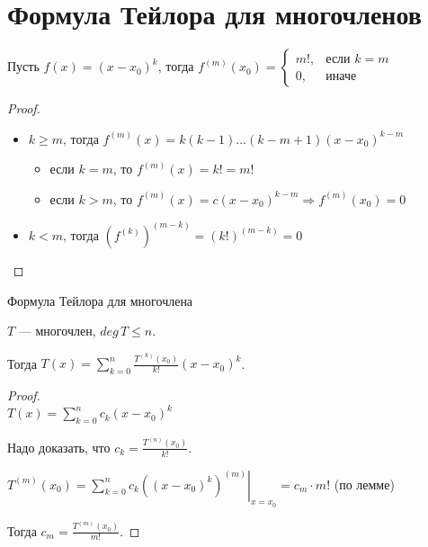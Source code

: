 \section{Формула Тейлора для многочленов}

\begin{lemma}

    Пусть $f(x) = (x -x_0)^k$, тогда $f^{(m)}(x_0) =
    \begin{cases}
        m!, &\text{если $k=m$}\\
        0, &\text{иначе}
    \end{cases}$
\end{lemma}

\begin{proof}  
    $\quad$ \\
    \begin{itemize}
        \item $k \geqslant m$, тогда $f^{(m)}(x) = k(k-1) \dots (k-m+1)(x-x_0)^{k-m}$
        \begin{itemize}
            \item если $k = m$, то $f^{(m)}(x) = k! = m!$
            \item если $k > m$, то $f^{(m)}(x) = c (x-x_0)^{k-m} \Longrightarrow f^{(m)}(x_0) = 0$
        \end{itemize}
        
        \item $k < m$, тогда $(f^{(k)})^{(m-k)} = (k!)^{(m-k)} = 0$
    \end{itemize}
\end{proof}

\begin{theorem-non}
    Формула Тейлора для многочлена

    $T$ --- многочлен, $deg \, T \leqslant n$. 

    Тогда $T(x) = \sum\limits_{k=0}^n \frac{T^{(k)}(x_0)}{k!} (x-x_0)^k$.
\end{theorem-non}
\begin{proof} $\quad$ \\
    $T(x) = \sum\limits_{k = 0}^{n} c_k (x-x_0)^k$
    
    Надо доказать, что $c_k = \frac{T^{(n)}(x_0)}{k!}$.

    $T^{(m)}(x_0) = \left.\sum\limits_{k = 0}^{n} c_k ((x-x_0)^k)^{(m)} \right|_{x=x_0} = c_m \cdot m!$ (по лемме)

    Тогда $c_m = \frac{T^{(m)}(x_0)}{m!}$.
\end{proof}

